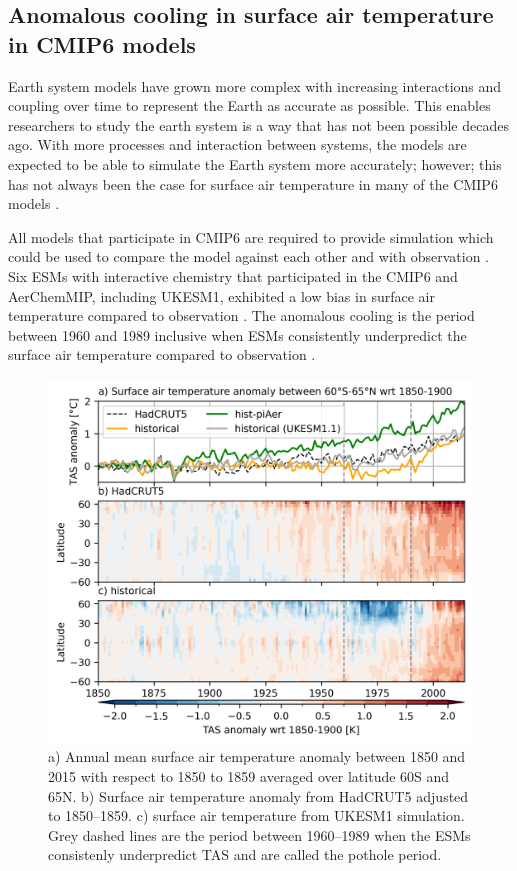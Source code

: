 \subsection{Anomalous cooling in surface air temperature in CMIP6 models}
\label{ch4:sec:pothole}

Earth system models have grown more complex with increasing interactions and coupling over time to represent the Earth as accurate as possible. This enables researchers to study the earth system is a way that has not been possible decades ago. With more processes and interaction between systems, the models are expected to be able to simulate the Earth system more accurately; however; this has not always been the case for surface air temperature in many of the CMIP6 models \citep{zhangRoleAnthropogenicAerosols2021}. 

All models that participate in CMIP6 are required to provide \hist{} simulation which could be used to compare the model against each other and with observation \citep{eyringOverviewCoupledModel2016}. Six ESMs with interactive chemistry that participated in the CMIP6 and AerChemMIP, including UKESM1, exhibited a low bias in surface air temperature compared to observation \citep{zhangRoleAnthropogenicAerosols2021}. The anomalous cooling is the period between 1960 and 1989 inclusive when ESMs consistently underpredict the surface air temperature compared to observation \citep{zhangRoleAnthropogenicAerosols2021}. 

\begin{figure}
    \centering
    \includegraphics{Chapter4/Figs/TAS_anomaly_cropped.png}
    \caption[Surface air anomaly from HadCRUT5, UKESM1, and UKESM1.1 between 1850 and 2015]{a) Annual mean surface air temperature anomaly between 1850 and 2015 with respect to 1850 to 1859 averaged over latitude 60\textdegree S and 65\textdegree N. b) Surface air temperature anomaly from HadCRUT5 adjusted to 1850--1859. c) surface air temperature from UKESM1 \hist{} simulation. Grey dashed lines are the period between 1960--1989 when the ESMs consistenly underpredict TAS and are called the pothole period.}
    \label{fig:ch4:seasonal-tas-anomaly}
\end{figure}

